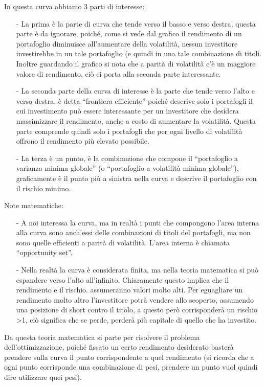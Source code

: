 \noindent
In questa curva abbiamo 3 parti di interesse:
\begin{enumerate}
\item[-] La prima è la parte di curva che tende verso il basso e verso destra, questa parte è da ignorare, poiché, come si vede dal grafico il rendimento di un portafoglio diminuisce all’aumentare della volatilità, nessun investitore investirebbe in un tale portafoglio (e quindi in una tale combinazione di titoli. Inoltre guardando il grafico si nota che a parità di volatilità c’è un maggiore valore di rendimento, ciò ci porta alla seconda parte interessante.
\item[-] La seconda parte della curva di interesse è la parte che tende verso l’alto e verso destra, è detta “frontiera efficiente” poiché descrive solo i portafogli il cui investimento può essere interessante per un investitore che desidera massimizzare il rendimento, anche a costo di aumentare la volatilità. Questa parte comprende quindi solo i portafogli che per ogni livello di volatilità offrono il rendimento più elevato possibile.
\item[-] La terza è un punto, è la combinazione che compone il “portafoglio a varianza minima globale” (o “portafoglio a volatilità minima globale”), graficamente è il punto più a sinistra nella curva e descrive il portafoglio con il rischio minimo.
\end{enumerate}


\noindent
Note matematiche:
\begin{enumerate}
    \item[-] A noi interessa la curva, ma in realtà i punti che compongono l’area interna alla curva sono anch’essi delle combinazioni di titoli del portafogli, ma non sono quelle efficienti a parità di volatilità. L’area interna è chiamata “opportunity set”.
    \item[-] Nella realtà la curva è considerata finita, ma nella teoria matematica si può espandere verso l’alto all’infinito. Chiaramente questo implica che il rendimento e il rischio. assumeranno valori molto alti. Per eguagliare un rendimento molto altro l’investitore potrà vendere allo scoperto, assumendo una posizione di short contro il titolo, a questo però corrisponderà un rischio >1, ciò significa che se perde, perderà più capitale di quello che ha investito.
\end{enumerate}

\noindent
Da questa teoria matematica si parte per risolvere il problema dell’ottimizzazione, poiché fissato un certo rendimento desiderato basterà prendere sulla curva il punto corrispondente a quel rendimento (si ricorda che a ogni punto corrisponde una combinazione di pesi, prendere un punto vuol quindi dire utilizzare quei pesi).

